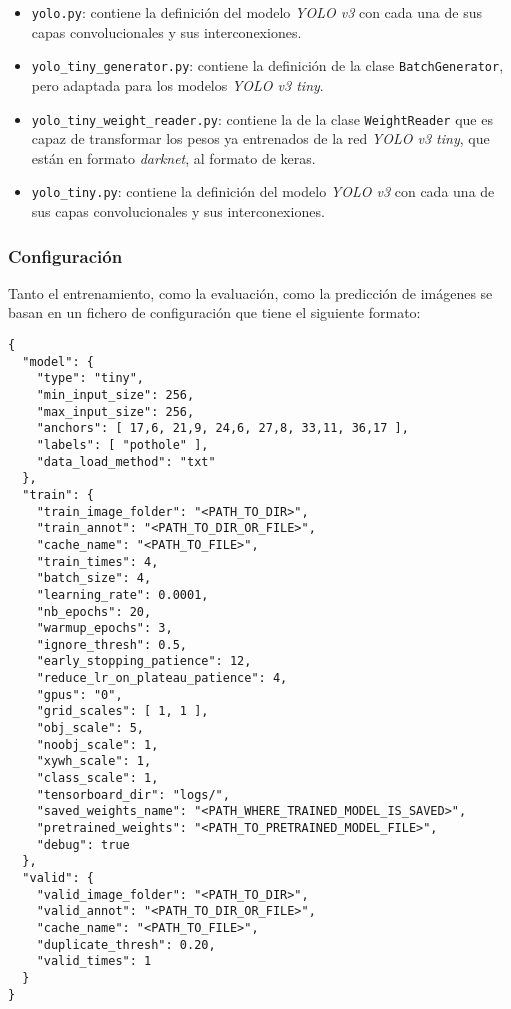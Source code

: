 \begin{itemize}
	\item \texttt{yolo.py}:  contiene la definición del modelo \textit{YOLO v3} con cada una de sus capas convolucionales y sus interconexiones.
	\item \texttt{yolo\_tiny\_generator.py}: contiene la definición de la clase \texttt{BatchGenerator}, pero adaptada para los modelos \textit{YOLO v3 tiny}.
	\item \texttt{yolo\_tiny\_weight\_reader.py}: contiene la de la clase \texttt{WeightReader} que es capaz de transformar los pesos ya entrenados de la red \textit{YOLO v3 tiny}, que están en formato \textit{darknet}, al formato de keras.
	\item \texttt{yolo\_tiny.py}: contiene la definición del modelo \textit{YOLO v3} con cada una de sus capas convolucionales y sus interconexiones.
\end{itemize}

\subsubsection*{Configuración}

Tanto el entrenamiento, como la evaluación, como la predicción de imágenes se basan en un fichero de configuración que tiene el siguiente formato:

\begin{lstlisting}[frame=single, basicstyle=\ttfamily\footnotesize, caption={Configuración de ejemplo}, captionpos=b]
{
  "model": {
    "type": "tiny",
    "min_input_size": 256,
    "max_input_size": 256,
    "anchors": [ 17,6, 21,9, 24,6, 27,8, 33,11, 36,17 ],
    "labels": [ "pothole" ],
    "data_load_method": "txt"
  },
  "train": {
    "train_image_folder": "<PATH_TO_DIR>",
    "train_annot": "<PATH_TO_DIR_OR_FILE>",
    "cache_name": "<PATH_TO_FILE>",
    "train_times": 4,
    "batch_size": 4,
    "learning_rate": 0.0001,
    "nb_epochs": 20,
    "warmup_epochs": 3,
    "ignore_thresh": 0.5,
    "early_stopping_patience": 12,
    "reduce_lr_on_plateau_patience": 4,
    "gpus": "0",
    "grid_scales": [ 1, 1 ],
    "obj_scale": 5,
    "noobj_scale": 1,
    "xywh_scale": 1,
    "class_scale": 1,
    "tensorboard_dir": "logs/",
    "saved_weights_name": "<PATH_WHERE_TRAINED_MODEL_IS_SAVED>",
    "pretrained_weights": "<PATH_TO_PRETRAINED_MODEL_FILE>",
    "debug": true
  },
  "valid": {
    "valid_image_folder": "<PATH_TO_DIR>",
    "valid_annot": "<PATH_TO_DIR_OR_FILE>",
    "cache_name": "<PATH_TO_FILE>",
    "duplicate_thresh": 0.20,
    "valid_times": 1
  }
}
\end{lstlisting}


